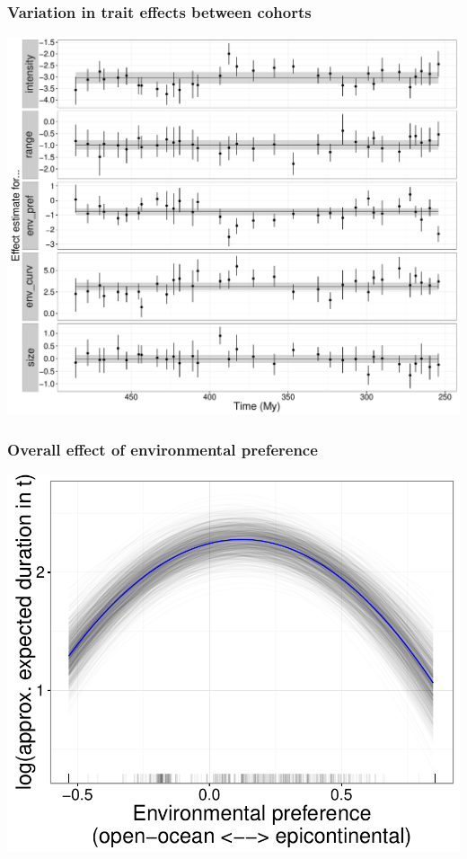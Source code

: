 \documentclass{beamer}
\begin{document}
\begin{frame}
  \frametitle{Variation in trait effects between cohorts}

  \begin{center}
    \includegraphics[width = \textwidth,height = 0.8\textheight,keepaspectratio = true]{figure/cohort_series_wide}
  \end{center}
\end{frame}

\begin{frame}
  \frametitle{Overall effect of environmental preference}

  \begin{center}
    \includegraphics[width = \textwidth,height = 0.8\textheight,keepaspectratio = true]{figure/env_effect}
  \end{center}
\end{frame}
\end{document}
